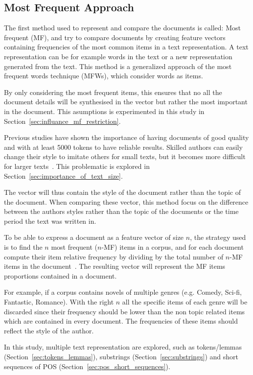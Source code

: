 \subsection{Most Frequent Approach}

The first method used to represent and compare the documents is called: Most frequent (MF), and try to compare documents by creating feature vectors containing frequencies of the most common items in a text representation.
A text representation can be for example words in the text or a new representation generated from the text.
This method is a generalized approach of the most frequent words technique (MFWs), which consider words as items.

By only considering the most frequent items, this ensures that no all the document details will be synthesised in the vector but rather the most important in the document.
This asumptions is experimented in this study in Section~\ref{sec:influance_mf_restriction}.

Previous studies have shown the importance of having documents of good quality and with at least 5000 tokens to have reliable results.
Skilled authors can easily change their style to imitate others for small texts, but it becomes more difficult for larger texts~\cite{savoy_stylo}.
This problematic is explored in Section~\ref{sec:importance_of_text_size}.

The vector will thus contain the style of the document rather than the topic of the document.
When comparing these vector, this method focus on the difference between the authors styles rather than the topic of the documents or the time period the text was written in.

To be able to express a document as a feature vector of size $n$, the strategy used is to find the $n$ most frequent ($n$-MF) items in a corpus, and for each document compute their item relative frequency by dividing by the total number of $n$-MF items in the document~\cite{savoy_stylo}.
The resulting vector will represent the MF items proportions contained in a document.

For example, if a corpus contains novels of multiple genres (e.g. Comedy, Sci-fi, Fantastic, Romance).
With the right $n$ all the specific items of each genre will be discarded since their frequency should be lower than the non topic related items which are contained in every document.
The frequencies of these items should reflect the style of the author.

In this study, multiple text representation are explored, such as tokens/lemmas (Section~\ref{sec:tokens_lemmas}), substrings (Section~\ref{sec:substrings}) and short sequences of POS (Section~\ref{sec:pos_short_sequences}).

